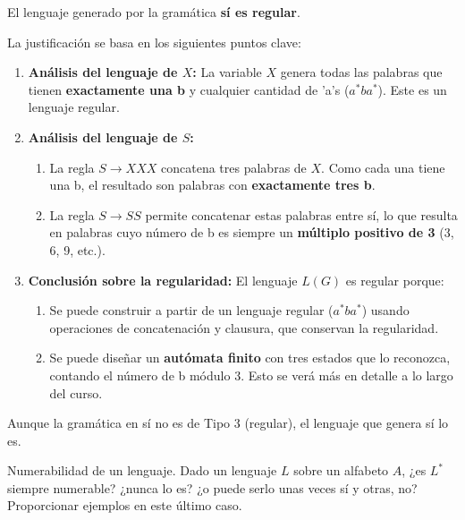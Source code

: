\documentclass[12pt]{book} %
\begin{document}
\begin{solucion}

    El lenguaje generado por la gramática \textbf{sí es regular}.

    La justificación se basa en los siguientes puntos clave:

    \begin{enumerate}
        \item \textbf{Análisis del lenguaje de \( X \):} La variable \( X \) genera todas las palabras que tienen \textbf{exactamente una b} y cualquier cantidad de 'a's (\( a^*ba^* \)). Este es un lenguaje regular.

        \item \textbf{Análisis del lenguaje de \( S \):}
        \begin{enumerate}
            \item La regla \( S \to XXX \) concatena tres palabras de \( X \). Como cada una tiene una b, el resultado son palabras con \textbf{exactamente tres b}.
            \item La regla \( S \to SS \) permite concatenar estas palabras entre sí, lo que resulta en palabras cuyo número de b es siempre un \textbf{múltiplo positivo de 3} (3, 6, 9, etc.).
        \end{enumerate}

        \item \textbf{Conclusión sobre la regularidad:} El lenguaje \( L(G) \) es regular porque:
        \begin{enumerate}
            \item Se puede construir a partir de un lenguaje regular (\( a^*ba^* \)) usando operaciones de concatenación y clausura, que conservan la regularidad.
            \item Se puede diseñar un \textbf{autómata finito} con tres estados que lo reconozca, contando el número de b módulo 3. Esto se verá más en detalle a lo largo del curso.
        \end{enumerate}
    \end{enumerate}

    Aunque la gramática en sí no es de Tipo 3 (regular), el lenguaje que genera sí lo es.

\end{solucion}

\begin{ejercicio}
Numerabilidad de un lenguaje.
Dado un lenguaje $L$ sobre un alfabeto $A$, ¿es $L^*$ siempre numerable? ¿nunca lo es? ¿o puede serlo unas veces sí y otras, no? Proporcionar ejemplos en este último caso.
\end{ejercicio}
\end{document}

